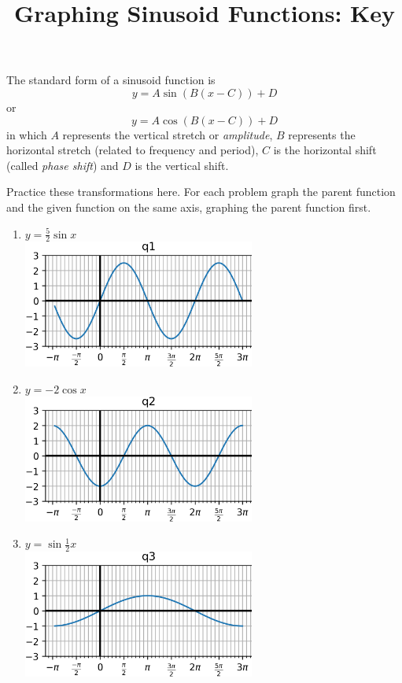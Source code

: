 \documentclass{article}
\begin{document}
\title{Graphing Sinusoid Functions: Key}
\maketitle
\begin{multicols}{2}
The standard form of a sinusoid function is
$$ y = A \sin(B(x-C)) + D $$
or
$$ y = A \cos(B(x-C)) + D $$
in which $A$ represents the vertical stretch or
\textit{amplitude}, $B$ represents the horizontal stretch
(related to frequency and period), $C$ is the horizontal
shift (called \textit{phase shift}) and $D$ is the vertical shift.

Practice these transformations here. For each problem graph
the parent function and the given function on the same axis,
graphing the parent function first.

\begin{enumerate}
	\item $y=\frac52 \sin x$ \\
	\includegraphics*[width=3in]{q1.png}
	\item $y=-2 \cos x$ \\
	\includegraphics*[width=3in]{q2.png}
	\item $y=\sin \frac12 x$ \\
	\includegraphics*[width=3in]{q3.png}

\end{enumerate}
\end{multicols}
\end{document}
